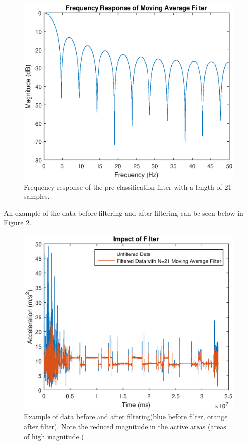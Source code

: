             \begin{figure}[h]
                \includegraphics[width=\textwidth]{Images/sleep_pre_filter.eps}
                \centering
                \caption{Frequency response of the pre-classification filter with a length of 21 samples.}
                \label{img_pp_filter}
            \end{figure}

            An example of the data before filtering and after filtering can be seen below in Figure \ref{img_pp_filter_ex}.

            \begin{figure}[h]
                \includegraphics[width=\textwidth]{Images/sleep_pre_filter_ex.eps}
                \centering
                \caption{Example of data before and after filtering(blue before filter, orange after filter). Note the reduced magnitude in the active areas (areas of high magnitude.)}
                \label{img_pp_filter_ex}
            \end{figure} 

